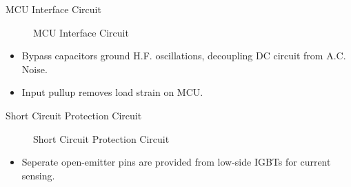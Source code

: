 \begin{frame}{MCU Interface Circuit}
	\begin{figure}
		\centering


		\caption{MCU Interface Circuit}
	\end{figure}

	\begin{itemize}
		\item Bypass capacitors ground H.F. oscillations, decoupling DC circuit from A.C. Noise.
		\item Input pullup removes load strain on MCU.
	\end{itemize}
\end{frame}



\begin{frame}{Short Circuit Protection Circuit}
	\begin{figure}
		\centering


		\caption{Short Circuit Protection Circuit}
	\end{figure}


	\begin{itemize}
		\item Seperate open-emitter pins are provided from low-side IGBTs for current sensing.
	\end{itemize}
\end{frame}



